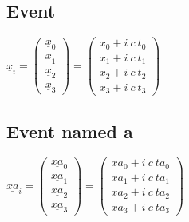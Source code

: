 \documentclass[]{article}
\title{}
\author{}
\begin{document}

\subsection{Event}
$
\underline{x}_i
=
\begin{pmatrix}
	\underline{x}_0\\
	\underline{x}_1\\
	\underline{x}_2\\
	\underline{x}_3
\end{pmatrix}
=
\begin{pmatrix}
	x_0 + i\ c\ t_0\\
	x_1 + i\ c\ t_1\\
	x_2 + i\ c\ t_2\\
	x_3 + i\ c\ t_3
\end{pmatrix}
$

\subsection{Event named a}
$
\underline{x{\scriptstyle a}}_i
=
\begin{pmatrix}
	\underline{x{\scriptstyle a}}_0\\
	\underline{x{\scriptstyle a}}_1\\
	\underline{x{\scriptstyle a}}_2\\
	\underline{x{\scriptstyle a}}_3
\end{pmatrix}
=
\begin{pmatrix}
	x{\scriptstyle a}_0 + i\ c\ t{\scriptstyle a}_0\\
	x{\scriptstyle a}_1 + i\ c\ t{\scriptstyle a}_1\\
	x{\scriptstyle a}_2 + i\ c\ t{\scriptstyle a}_2\\
	x{\scriptstyle a}_3 + i\ c\ t{\scriptstyle a}_3
\end{pmatrix}
$
\end{document}
